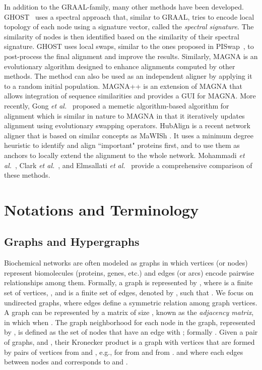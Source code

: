 \documentclass[10pt, journal, compsoc, final]{IEEEtran}
\begin{document}
In addition to the GRAAL-family, many other methods have been developed. GHOST~\cite{GHOST} uses a spectral approach that, similar to GRAAL, tries to encode local topology of each node using a signature vector, called the \textit{spectral signature}. The similarity of nodes is then identified based on the similarity of their spectral signature. GHOST uses local swaps, similar to the ones proposed in PISwap~\cite{PISWAP}, to post-process the final alignment and improve the results. Similarly, MAGNA \cite{MAGNA} is an evolutionary algorithm designed to enhance alignments computed by other methods. The method can also be used as an independent aligner by applying it to a random initial population. MAGNA++ \cite{MAGNA++} is an extension of MAGNA that allows integration of sequence similarities and provides a GUI for MAGNA. More recently, Gong \textit{et al.}~\cite{Gong2015} proposed a memetic algorithm-based algorithm for alignment which is similar in nature to MAGNA in that it iteratively updates alignment using evolutionary swapping operators.
HubAlign \cite{HubAlign} is a recent network aligner that is based on similar concepts as MaWISh \cite{MAWISH}. It uses a minimum degree heuristic to identify and align ``important" proteins first, and to use them as anchors to locally extend the alignment to the whole network. Mohammadi \textit{et al.}~\cite{AlignmentChapter}, Clark \textit{et al.}~\cite{Clark2014}, and Elmsallati \textit{et al.}~\cite{Elmsallati2015} provide a comprehensive comparison of these methods.


\section{Notations and Terminology}
\subsection{Graphs and Hypergraphs}

Biochemical networks are often modeled as graphs in which vertices (or nodes) represent
biomolecules (proteins, genes, etc.) and edges (or arcs) encode pairwise relationships among
them. Formally, a graph  is represented by ,
where  is a finite set of vertices, , and
 is a finite set of edges, denoted by , such that . We focus on undirected graphs, where edges define a 
symmetric relation among graph vertices.
A graph can be represented by a matrix  of size ,
known as the \textit{adjacency matrix}, in which  when . The graph neighborhood for each node  in the graph, represented by ,
is defined as the set of nodes that have an edge with ; formally . Given a pair of graphs,  and
, their Kronecker product is a graph with 
vertices that are formed by pairs of vertices from  and , e.g.,  for  from  and  from . and where each edges between nodes  and  corresponds to  and
.
\end{document}
